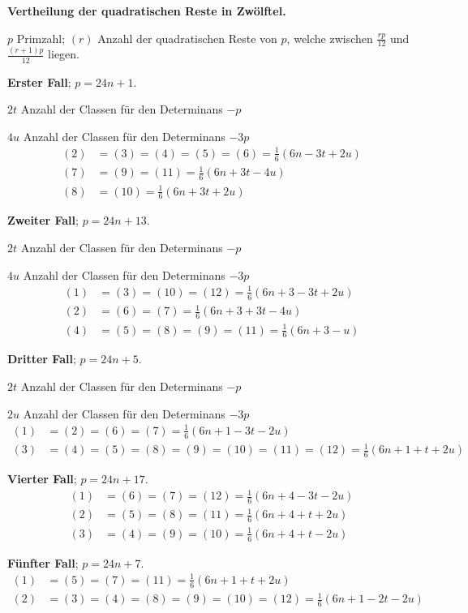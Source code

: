 \documentclass[12pt,a4paper]{article}
\begin{document}
\textbf{Vertheilung der quadratischen Reste in Zw\"olftel.}

$p$ Primzahl; $(r)$ Anzahl der quadratischen Reste von $p$, welche zwischen $\frac{rp}{12}$ und $\frac{(r+1)p}{12}$ liegen.

\textbf{Erster Fall}; $p = 24n+1$.

$2t$ Anzahl der Classen f\"ur den Determinans $-p$

$4u$ Anzahl der Classen f\"ur den Determinans $-3p$
\begin{align*}
(2) &= (3) = (4) = (5) = (6) = \tfrac{1}{6}(6n-3t+2u)\\
(7) &= (9) = (11) = \tfrac{1}{6}(6n+3t-4u)\\
(8) &= (10) = \tfrac{1}{6}(6n+3t+2u)
\end{align*}

\textbf{Zweiter Fall}; $p = 24n+13$.

$2t$ Anzahl der Classen f\"ur den Determinans $-p$

$4u$ Anzahl der Classen f\"ur den Determinans $-3p$
\begin{align*}
(1) &= (3) = (10) = (12) = \tfrac{1}{6}(6n+3-3t+2u)\\
(2) &= (6) = (7) = \tfrac{1}{6}(6n+3+3t-4u)\\
(4) &= (5) = (8) = (9) = (11) = \tfrac{1}{6}(6n+3-u)
\end{align*}

\textbf{Dritter Fall}; $p = 24n+5$.

$2t$ Anzahl der Classen f\"ur den Determinans $-p$

$2u$ Anzahl der Classen f\"ur den Determinans $-3p$
\begin{align*}
(1) &= (2) = (6) = (7) = \tfrac{1}{6}(6n+1-3t-2u)\\
(3) &= (4) = (5) = (8) = (9) = (10) = (11) = (12) = \tfrac{1}{6}(6n+1+t+2u)
\end{align*}

\textbf{Vierter Fall}; $p = 24n+17$.
\begin{align*}
(1) &= (6) = (7) = (12) = \tfrac{1}{6}(6n+4-3t-2u)\\
(2) &= (5) = (8) = (11) = \tfrac{1}{6}(6n+4+t+2u)\\
(3) &= (4) = (9) = (10) = \tfrac{1}{6}(6n+4+t-2u)
\end{align*}

\textbf{F\"unfter Fall}; $p = 24n+7$.
\begin{align*}
(1) &= (5) = (7) = (11) = \tfrac{1}{6}(6n+1+t+2u)\\
(2) &= (3) = (4) = (8) = (9) = (10) = (12) = \tfrac{1}{6}(6n+1-2t-2u)
\end{align*}
\end{document}

